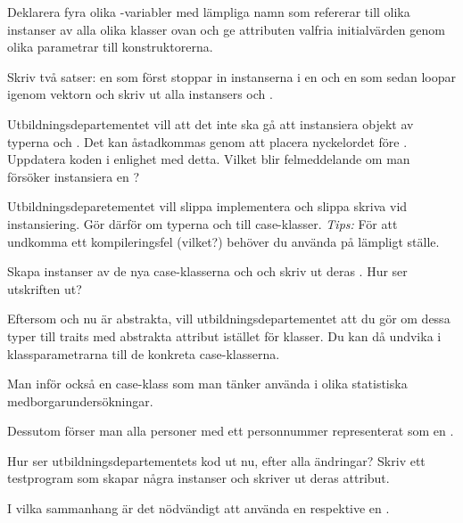 \Subtask Deklarera fyra olika -variabler med lämpliga namn som refererar till olika instanser av alla olika klasser ovan och ge attributen valfria initialvärden genom olika parametrar till konstruktorerna.

\Subtask Skriv två satser: en som först stoppar in instanserna i en  och en som sedan loopar igenom vektorn och skriv ut alla instansers  och . 


\Subtask Utbildningsdepartementet vill att det inte ska gå att instansiera objekt av typerna  och . Det kan åstadkommas genom att placera nyckelordet  före . Uppdatera koden i enlighet med detta. Vilket blir felmeddelande om man försöker instansiera en ?

\Subtask Utbildningsdeparetementet vill slippa implementera  och slippa skriva  vid instansiering. Gör därför om typerna  och  till case-klasser. \emph{Tips:} För att undkomma ett kompileringsfel (vilket?) behöver du använda  på lämpligt ställe. 

Skapa instanser av de nya case-klasserna  och  och skriv ut deras . Hur ser utskriften ut?

\Subtask Eftersom  och  nu är abstrakta, vill utbildningsdepartementet att du gör om dessa typer till traits med abstrakta attribut istället för klasser. Du kan då undvika  i klassparametrarna till de konkreta case-klasserna. 

Man inför också en case-klass  som man tänker använda i olika statistiska medborgarundersökningar. 

Dessutom förser man alla personer med ett personnummer representerat som en . 

Hur ser utbildningsdepartementets kod ut nu, efter alla ändringar? Skriv ett testprogram som skapar några instanser och skriver ut deras attribut. 

\Subtask\Pen I vilka sammanhang är det nödvändigt att använda en  respektive en .




